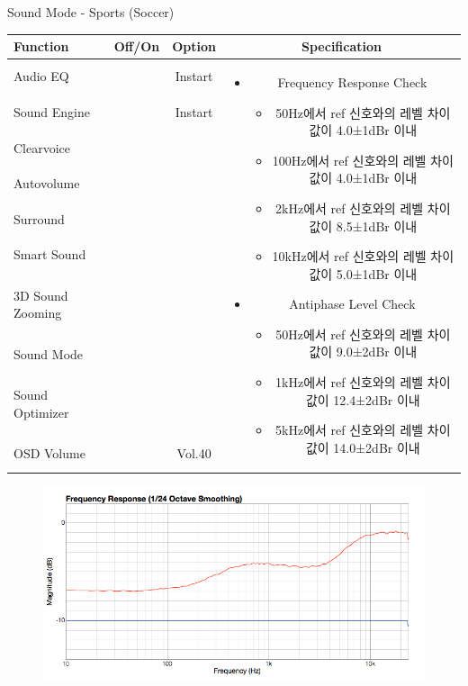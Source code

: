 \begin{frame}[t]{Sound Mode - Sports (Soccer)}
\begin{tiny}
\begin{tabular}{@{}lccc@{}}
\toprule
Function & Off/On & Option & Specification \\
\midrule
Audio EQ & \color{black}{Off} & Instart &
\multirow{10}{60mm}{
\begin{itemize}
\item Frequency Response Check
	\begin{itemize}
	\item 50Hz에서 ref 신호와의 레벨 차이값이 4.0±1dBr 이내
	\item 100Hz에서 ref 신호와의 레벨 차이값이 4.0±1dBr 이내
	\item 2kHz에서 ref 신호와의 레벨 차이값이 8.5±1dBr 이내
	\item 10kHz에서 ref 신호와의 레벨 차이값이 5.0±1dBr 이내
	\end{itemize}
\item Antiphase Level Check
	\begin{itemize}
	\item 50Hz에서 ref 신호와의 레벨 차이값이 9.0±2dBr 이내
	\item 1kHz에서 ref 신호와의 레벨 차이값이 12.4±2dBr 이내
	\item 5kHz에서 ref 신호와의 레벨 차이값이 14.0±2dBr 이내
	\end{itemize}
\end{itemize}
} \\
Sound Engine & \color{blue}{On} & Instart & \\
Clearvoice & \color{black}{Off} & & \\
Autovolume & \color{black}{Off} & & \\
Surround & \color{black}{Off} & & \\
Smart Sound & \color{black}{Off} & & \\
3D Sound Zooming & \color{black}{Off} & & \\
Sound Mode & \color{blue}{On} & \color{blue}{Sports} & \\
Sound Optimizer & \color{black}{Off} & & \\
OSD Volume & \color{blue}{On} & Vol.40 & \\
\midrule
\end{tabular}
\end{tiny}

\begin{figure}[b]
\includegraphics[height=0.4\textwidth]{figures/sports.png}
\end{figure}

\end{frame}